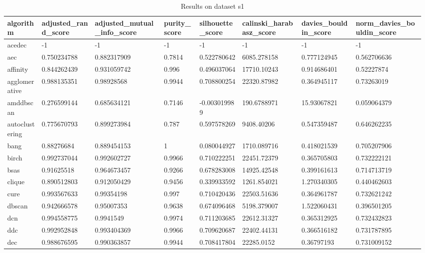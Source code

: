 \begin{table}[H]
\centering
\caption{Results on dataset s1}
\label{S65_Table}
\begin{tabular}{|l|l|l|l|l|l|l|l|}
\hline
algorithm & adjusted\_rand\_score & adjusted\_mutual\_info\_score & purity\_score & silhouette\_score & calinski\_harabasz\_score & davies\_bouldin\_score & norm\_davies\_bouldin\_score \\
\hline
acedec & -1 & -1 & -1 & -1 & -1 & -1 & -1 \\
\hline
aec & 0.750234788 & 0.882317909 & 0.7814 & 0.522780642 & 6085.278158 & 0.777124945 & 0.562706636 \\
\hline
affinity & 0.844262439 & 0.931059742 & 0.996 & 0.496037064 & 17710.10243 & 0.914686401 & 0.52227874 \\
\hline
agglomerative & 0.988135351 & 0.98928568 & 0.9944 & 0.708800254 & 22320.87982 & 0.364945117 & 0.73263019 \\
\hline
amddbscan & 0.276599144 & 0.685634121 & 0.7146 & -0.003019989 & 190.6788971 & 15.93067821 & 0.059064379 \\
\hline
autoclustering & 0.775670793 & 0.899273984 & 0.787 & 0.597578269 & 9408.40206 & 0.547359487 & 0.646262235 \\
\hline
bang & 0.88276684 & 0.889454153 & 1 & 0.080044927 & 1710.089716 & 0.418021539 & 0.705207906 \\
\hline
birch & 0.992737044 & 0.992602727 & 0.9966 & 0.710222251 & 22451.72379 & 0.365705803 & 0.732222121 \\
\hline
bsas & 0.91625518 & 0.964673457 & 0.9266 & 0.678283008 & 14925.42548 & 0.399161613 & 0.714713719 \\
\hline
clique & 0.890512803 & 0.912050429 & 0.9456 & 0.339933592 & 1261.854021 & 1.270340305 & 0.440462603 \\
\hline
cure & 0.993567633 & 0.99354198 & 0.997 & 0.710420436 & 22503.51636 & 0.364961787 & 0.732621242 \\
\hline
dbscan & 0.942666578 & 0.95007353 & 0.9638 & 0.674096468 & 5198.379007 & 1.522060431 & 0.396501205 \\
\hline
dcn & 0.994558775 & 0.9941549 & 0.9974 & 0.711203685 & 22612.31327 & 0.365312925 & 0.732432823 \\
\hline
ddc & 0.992952848 & 0.993404369 & 0.9966 & 0.709620687 & 22402.44131 & 0.366516182 & 0.731787895 \\
\hline
dec & 0.988676595 & 0.990363857 & 0.9944 & 0.708417804 & 22285.0152 & 0.36797193 & 0.731009152 \\

\end{tabular}
\end{table}
